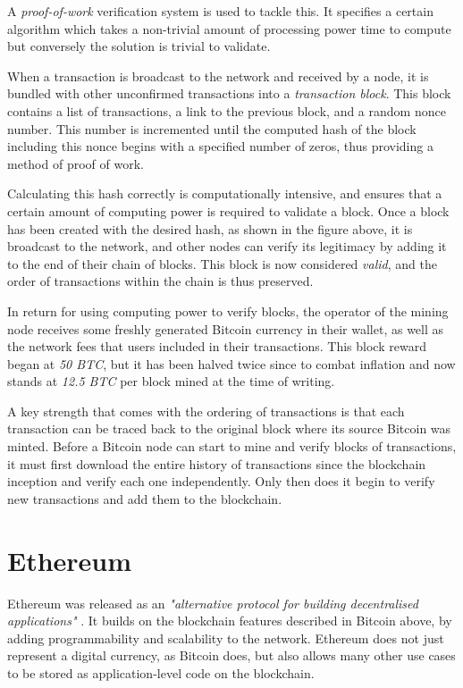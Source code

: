 A \textit{proof-of-work} verification system is used to tackle this. It specifies a certain algorithm which takes a non-trivial amount of processing power time to compute but conversely the solution is trivial to validate. 

When a transaction is broadcast to the network and received by a node, it is bundled with other unconfirmed transactions into a \textit{transaction block}. This block contains a list of transactions, a link to the previous block, and a random nonce number. This number is incremented until the computed hash of the block including this nonce begins with a specified number of zeros, thus providing a method of proof of work.

Calculating this hash correctly is computationally intensive, and ensures that a certain amount of computing power is required to validate a block. Once a block has been created with the desired hash, as shown in the figure above, it is broadcast to the network, and other nodes can verify its legitimacy by adding it to the end of their chain of blocks. This block is now considered \textit{valid}, and the order of transactions within the chain is thus preserved. 

In return for using computing power to verify blocks, the operator of the mining node receives some freshly generated Bitcoin currency in their wallet, as well as the network fees that users included in their transactions. This block reward began at \textit{50 BTC}, but it has been halved twice since to combat inflation and now stands at \textit{12.5 BTC} per block mined at the time of writing.

A key strength that comes with the ordering of transactions is that each transaction can be traced back to the original block where its source Bitcoin was minted. Before a Bitcoin node can start to mine and verify blocks of transactions, it must first download the entire history of transactions since the blockchain inception and verify each one independently. Only then does it begin to verify new transactions and add them to the blockchain.

\section{Ethereum}
Ethereum was released as an \textit{"alternative protocol for building decentralised applications"} \cite{buterin_ethereum:_2014}. It builds on the blockchain features described in Bitcoin above, by adding programmability and scalability to the network. Ethereum does not just represent a digital currency, as Bitcoin does, but also allows many other use cases to be stored as application-level code on the blockchain.

